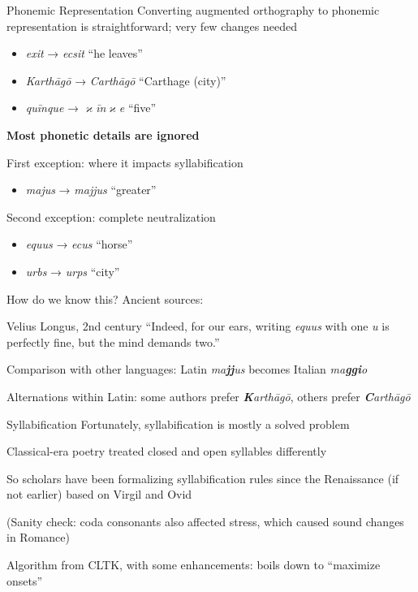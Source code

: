 \documentclass{beamer}
\begin{document}
\begin{frame}{Phonemic Representation}
Converting augmented orthography to phonemic representation is straightforward; very few changes needed
\vspace{-1em}
\begin{itemize}
    \item \emph{exit} → \emph{ecsit} ``he leaves''
    \item \emph{Karthāgō} → \emph{Carthāgō} ``Carthage (city)''
    \item \emph{quīnque} → \emph{\(\varkappa\)īn\(\varkappa\)e} ``five''
\end{itemize}

\textbf{Most phonetic details are ignored}

First exception: where it impacts syllabification
\vspace{-1em}
\begin{itemize}
    \item \emph{majus} → \emph{majjus} ``greater''
\end{itemize}
\vspace{-0.75em}
Second exception: complete neutralization
\vspace{-1em}
\begin{itemize}
    \item \emph{equus} → \emph{ecus} ``horse''
    \item \emph{urbs} → \emph{urps} ``city''
\end{itemize}
\end{frame}

\begin{frame}{How do we know this?}
Ancient sources:
\begin{block}{Velius Longus, 2nd century}
``Indeed, for our ears, writing \emph{equus} with one \emph{u} is perfectly fine, but the mind demands two.''
\end{block}

Comparison with other languages: Latin \emph{ma\textbf{jj}us} becomes Italian \emph{ma\textbf{ggi}o}

Alternations within Latin: some authors prefer \emph{\textbf{K}arthāgō}, others prefer \emph{\textbf{C}arthāgō}
\end{frame}

\begin{frame}{Syllabification}
Fortunately, syllabification is mostly a solved problem

Classical-era poetry treated closed and open syllables differently

So scholars have been formalizing syllabification rules since the Renaissance (if not earlier) based on Virgil and Ovid

(Sanity check: coda consonants also affected stress, which caused sound changes in Romance)

Algorithm from CLTK, with some enhancements: boils down to ``maximize onsets''
\end{frame}
\end{document}
